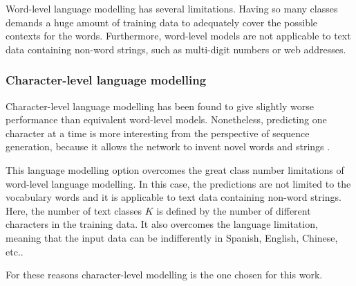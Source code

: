 Word-level language modelling has several limitations. Having so many classes demands a huge amount of training data to adequately cover the possible contexts for the words. Furthermore, word-level models are not applicable to text data containing non-word strings, such as multi-digit numbers or web addresses.\cite{graves2013generating}

\subsubsection{Character-level language modelling}


Character-level language modelling has been found to give slightly worse performance than equivalent word-level models. Nonetheless, predicting one character at a time is more interesting from the perspective of sequence generation, because it allows the network to invent novel words and strings \cite{graves2013generating}. 

This language modelling option overcomes the great class number limitations of word-level language modelling. In this case, the predictions are not limited to the vocabulary words and it is applicable to text data containing non-word strings. Here, the number of text classes $K$ is defined by the number of different characters in the training data. It also overcomes the language limitation, meaning that the input data can be indifferently in Spanish, English, Chinese, etc.. 

For these reasons character-level modelling is the one chosen for this work.

 


